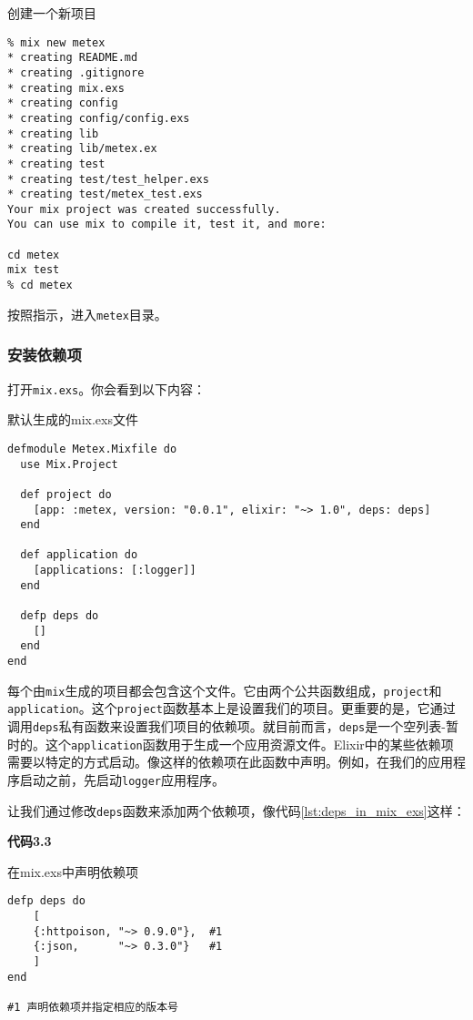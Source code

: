 \begin{code}{创建一个新项目}
\begin{verbatim}
% mix new metex
* creating README.md
* creating .gitignore
* creating mix.exs
* creating config
* creating config/config.exs
* creating lib
* creating lib/metex.ex
* creating test
* creating test/test_helper.exs
* creating test/metex_test.exs
Your mix project was created successfully.
You can use mix to compile it, test it, and more:

cd metex
mix test
% cd metex
\end{verbatim}
\label{lst:create_new_project}
\end{code}

按照指示，进入\texttt{metex}目录。

\subsubsection{安装依赖项}

打开\texttt{mix.exs}。你会看到以下内容：

\begin{code}{ 默认生成的mix.exs文件}
\begin{verbatim}
defmodule Metex.Mixfile do
  use Mix.Project

  def project do
    [app: :metex, version: "0.0.1", elixir: "~> 1.0", deps: deps]
  end

  def application do
    [applications: [:logger]]
  end

  defp deps do
    []
  end
end
\end{verbatim}
\label{lst:defautl_mix_exs}
\end{code}

每个由\texttt{mix}生成的项目都会包含这个文件。它由两个公共函数组成，\texttt{project}和\texttt{application}。这个\texttt{project}函数基本上是设置我们的项目。更重要的是，它通过调用\texttt{deps}私有函数来设置我们项目的依赖项。就目前而言，\texttt{deps}是一个空列表-暂时的。这个\texttt{application}函数用于生成一个应用资源文件。Elixir中的某些依赖项需要以特定的方式启动。像这样的依赖项在此函数中声明。例如，在我们的应用程序启动之前，先启动\texttt{logger}应用程序。

让我们通过修改\texttt{deps}函数来添加两个依赖项，像代码\ref{lst:deps_in_mix_exs}这样：

\textbf{代码3.3 }

\begin{code}{在mix.exs中声明依赖项}
\begin{verbatim}
defp deps do
    [
    {:httpoison, "~> 0.9.0"},  #1
    {:json,      "~> 0.3.0"}   #1
    ]
end

#1 声明依赖项并指定相应的版本号
\end{verbatim}
\label{lst:deps_in_mix_exs}
\end{code}

